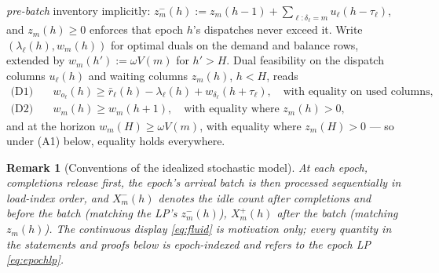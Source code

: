 \documentclass[11pt]{article}
\newtheorem{remark}{Remark}
\begin{document}
\emph{pre-batch} inventory implicitly:
$z^{-}_m(h) := z_m(h{-}1) + \sum_{\ell: \delta_{\ell}=m}
u_{\ell}(h - \tau_{\ell})$, and $z_m(h) \geq 0$ enforces that epoch
$h$'s dispatches never exceed it. Write
$(\lambda_{\ell}(h), w_m(h))$ for optimal duals on the demand and
balance rows, extended by $w_m(h') := \omega V(m)$ for $h' > H$.
Dual feasibility on the dispatch columns $u_{\ell}(h)$ and waiting
columns $z_m(h)$, $h < H$, reads
\begin{align}
  \text{(D1)}\quad & w_{o_{\ell}}(h) \geq \bar{r}_{\ell}(h)
  - \lambda_{\ell}(h) + w_{\delta_{\ell}}(h + \tau_{\ell}),
  \quad \text{with equality on used columns}, \nonumber \\
  \text{(D2)}\quad & w_m(h) \geq w_m(h + 1),
  \quad \text{with equality where } z_m(h) > 0, \nonumber
\end{align}
and at the horizon $w_m(H) \geq \omega V(m)$, with equality where
$z_m(H) > 0$ --- so under (A1) below, equality holds everywhere.

\begin{remark}[Conventions of the idealized stochastic model]
\label{rem:hourlyreading}
At each epoch, completions release first, the epoch's arrival batch
is then processed sequentially in load-index order, and $X^{-}_m(h)$
denotes the idle count after completions and before the batch
(matching the LP's $z^{-}_m(h)$), $X^{+}_m(h)$ after the batch
(matching $z_m(h)$). The continuous display \eqref{eq:fluid} is
motivation only; every quantity in the statements and proofs below
is epoch-indexed and refers to the epoch LP \eqref{eq:epochlp}.
\end{remark}
\end{document}
